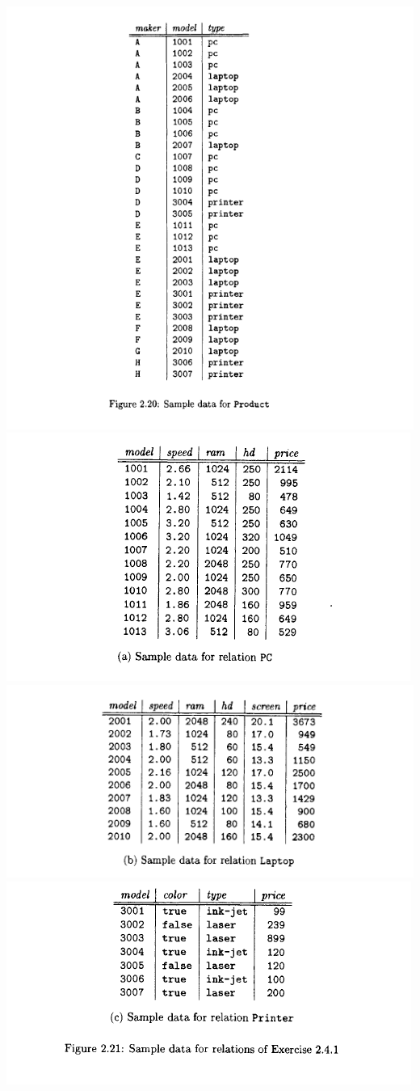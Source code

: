 \documentclass[12pt]{article}
\begin{document}
\begin{enumerate}[1.]
    \begin{center}
    \includegraphics[width=0.75\linewidth]{images/worksheet_2_5.png}
    \includegraphics[width=0.75\linewidth]{images/worksheet_2_6.png}
    \includegraphics[width=0.75\linewidth]{images/worksheet_2_7.png}
    \includegraphics[width=0.75\linewidth]{images/worksheet_2_8.png}
    \end{center}


\end{enumerate}
\end{document}
